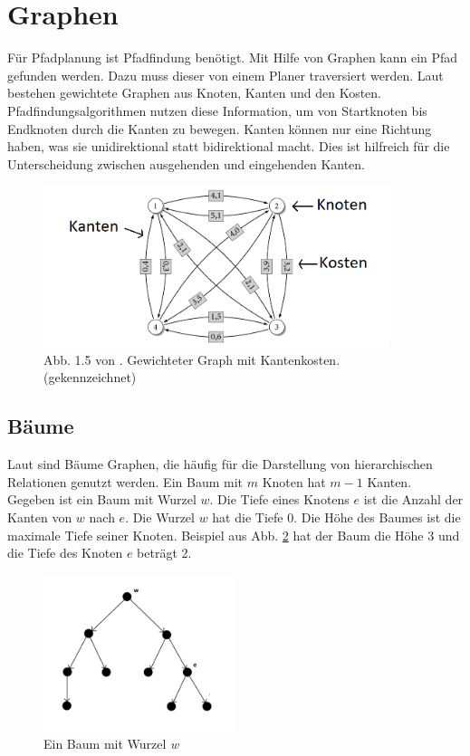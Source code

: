 \section{Graphen}
Für Pfadplanung ist Pfadfindung benötigt. Mit Hilfe von Graphen kann ein Pfad gefunden werden. Dazu muss dieser von einem Planer traversiert werden. Laut \cite{Turau:15} bestehen gewichtete Graphen aus Knoten, Kanten und den Kosten. Pfadfindungsalgorithmen nutzen diese Information, um von Startknoten bis Endknoten durch die Kanten zu bewegen. Kanten können nur eine Richtung haben, was sie unidirektional statt bidirektional macht. Dies ist hilfreich für die Unterscheidung zwischen ausgehenden und eingehenden Kanten.

\begin{figure} %
	\centering
	\includegraphics[width=0.9\textwidth]{images/kk_graph_S6.png}
	\caption{Abb. 1.5 von \cite[~S. 6]{Turau:15}. Gewichteter Graph mit Kantenkosten.(gekennzeichnet)}
	\label{sec0a}
\end{figure}

\subsection{Bäume}
Laut \cite{Turau:15} sind Bäume Graphen, die häufig für die Darstellung von hierarchischen Relationen genutzt werden. Ein Baum mit $m$ Knoten hat $m-1$ Kanten.\\
Gegeben ist ein Baum mit Wurzel $w$. Die Tiefe eines Knotens $e$ ist die Anzahl der Kanten von $w$ nach $e$. Die Wurzel $w$ hat die Tiefe 0. Die Höhe des Baumes ist die maximale Tiefe seiner Knoten. Beispiel aus Abb. \ref{sec0b} hat der Baum die Höhe 3 und die Tiefe des Knoten $e$ beträgt 2.

\begin{figure} %
	\centering
	\includegraphics[width=0.5\textwidth]{images/Tree_Graph.png}
	\caption{Ein Baum mit Wurzel \textit{w}}
	\label{sec0b}
\end{figure}

